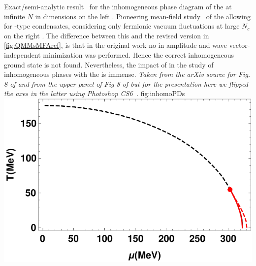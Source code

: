 	{%
		Exact/semi-analytic result~\cite{Thies:2003kk} for the inhomogeneous phase diagram of the \gnm{} at infinite $N$ in  dimensions on the left .
		Pioneering mean-field study~\cite{Broniowski:1990dy} of the \qmm{} allowing for \cdw{}-type condensates, considering only fermionic vacuum fluctuations at large $N_c$ on the right .
		The difference between this and the revised version in \cref{fig:QMMsMFAref}, is that in the original work no in amplitude and wave vector-independent minimization was performed.
		Hence the correct inhomogeneous ground state is not found. Nevertheless, the impact of  in the study of inhomogeneous phases with the \cdw{} is immense.
		\textit{Taken from the arXiv source for Fig. 8 of  and from the upper panel of Fig 8 of  but for the presentation here we flipped the axes in the latter using Photoshop CS6~\cite{photoshopCS6}.}
	}%
	{fig:inhomoPDs}
	{\hspace{.3cm}\includegraphics[width=\subcaptionFigureWidth]{inhomo/figures/PhysRevD.96.016013Fig3.pdf}} %
